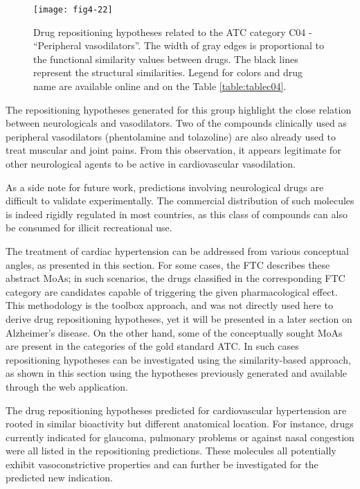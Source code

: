 \begin{figure}[H]
    \centering
    \texttt{[image: fig4-22]}
    \caption{Drug repositioning hypotheses related to the ATC category C04 - “Peripheral vasodilators”. The width of gray edges is proportional to the functional similarity values between drugs. The black lines represent the structural similarities. Legend for colors and drug name are available online and on the Table \ref{table:tablec04}.}
    \label{fig4-22}
\end{figure}

The repositioning hypotheses generated for this group highlight the close relation between neurologicals and vasodilators. Two of the compounds clinically used as peripheral vasodilators (phentolamine and tolazoline) are also already used to treat muscular and joint pains. From this observation, it appears legitimate for other neurological agents to be active in cardiovascular vasodilation.

As a side note for future work, predictions involving neurological drugs are difficult to validate experimentally. The commercial distribution of such molecules is indeed rigidly regulated in most countries, as this class of compounds can also be consumed for illicit recreational use.

The treatment of cardiac hypertension can be addressed from various conceptual angles, as presented in this section. For some cases, the FTC describes these abstract MoAs; in such scenarios, the drugs classified in the corresponding FTC category are candidates capable of triggering the given pharmacological effect. This methodology is the toolbox approach, and was not directly used here to derive drug repositioning hypotheses, yet it will be presented in a later section on Alzheimer's disease. On the other hand, some of the conceptually sought MoAs are present in the categories of the gold standard ATC. In such cases repositioning hypotheses can be investigated using the similarity-based approach, as shown in this section using the hypotheses previously generated and available through the web application.

The drug repositioning hypotheses predicted for cardiovascular hypertension are rooted in similar bioactivity but different anatomical location. For instance, drugs currently indicated for glaucoma, pulmonary problems or against nasal congestion were all listed in the repositioning predictions. These molecules all potentially exhibit vasoconstrictive properties and can further be investigated for the predicted new indication.

